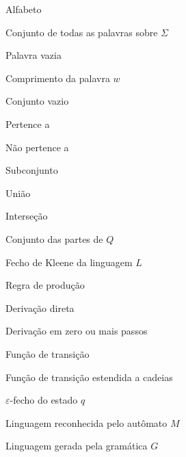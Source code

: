 \documentclass[
    12pt
    ,oneside
    ,a4paper
    ,chapter=TITLE
    ,section=TITLE
    ,sumario=abnt-6027-2012]{abntex2}
\begin{document}
\begin{simbolos}
    \item[$\Sigma$]                   Alfabeto
    \item[$\Sigma^*$]                 Conjunto de todas as palavras sobre $\Sigma$
    \item[$\varepsilon$]              Palavra vazia
    \item[$|w|$]                      Comprimento da palavra $w$
    \item[$\varnothing$]              Conjunto vazio
    \item[$\in$]                      Pertence a
    \item[$\notin$]                   Não pertence a
    \item[$\subseteq$]                Subconjunto
    \item[$\cup$]                     União
    \item[$\cap$]                     Interseção
    \item[$\mathcal{P}(Q)$]           Conjunto das partes de $Q$
    \item[$L^*$]                      Fecho de Kleene da linguagem $L$
    \item[$\to$]                      Regra de produção
    \item[$\Rightarrow$]              Derivação direta
    \item[$\Rightarrow^*$]            Derivação em zero ou mais passos
    \item[$\delta$]                   Função de transição
    \item[$\hat{\delta}$]             Função de transição estendida a cadeias
    \item[$E(q)$]                     $\varepsilon$-fecho do estado $q$
    \item[$L(M)$]                     Linguagem reconhecida pelo autômato $M$
    \item[$L(G)$]                     Linguagem gerada pela gramática $G$
\end{simbolos}

\sumario

\end{document}
